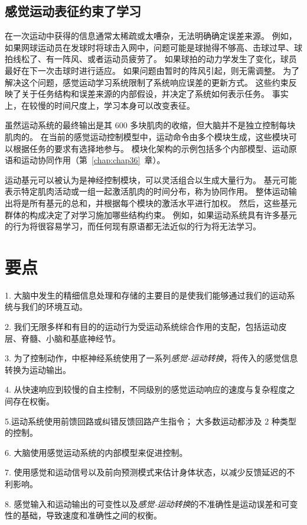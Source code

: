 \subsection{感觉运动表征约束了学习}

在一次运动中获得的信息通常太稀疏或太嘈杂，无法明确确定误差来源。
例如，如果网球运动员在发球时将球击入网中，问题可能是球抛得不够高、击球过早、球拍线松了、有一阵风、或者运动员疲劳了。
如果球拍的动力学发生了变化，球员最好在下一次击球时进行适应。
如果问题由暂时的阵风引起，则无需调整。
为了解决这个问题，感觉运动学习系统限制了系统响应误差的更新方式。
这些约束反映了关于任务结构和误差来源的内部假设，并决定了系统如何表示任务。
事实上，在较慢的时间尺度上，学习本身可以改变表征。


虽然运动系统的最终输出是其 600 多块肌肉的收缩，但大脑并不是独立控制每块肌肉的。
在当前的感觉运动控制模型中，运动命令由多个模块生成，这些模块可以根据任务的要求有选择地参与。
模块化架构的示例包括多个内部模型、运动原语和运动协同作用（第~\ref{chap:chap36}~章）。


运动基元可以被认为是神经控制模块，可以灵活组合以生成大量行为。
基元可能表示特定肌肉活动或一组一起激活肌肉的时间分布，称为协同作用。
整体运动输出将是所有基元的总和，并根据每个模块的激活水平进行加权。
然后，这些基元群体的构成决定了对学习施加哪些结构约束。
例如，如果运动系统具有许多基元的行为将很容易学习，而任何现有原语都无法近似的行为将无法学习。



\section{要点}

1. 大脑中发生的精细信息处理和存储的主要目的是使我们能够通过我们的运动系统与我们的环境互动。


2. 我们无限多样和有目的的运动行为受运动系统综合作用的支配，包括运动皮层、脊髓、小脑和基底神经节。


3. 为了控制动作，中枢神经系统使用了一系列\textit{感觉-运动转换}，将传入的感觉信息转换为运动输出。


4. 从快速响应到较慢的自主控制，不同级别的感觉运动响应的速度与复杂程度之间存在权衡。


5.运动系统使用前馈回路或纠错反馈回路产生指令；
大多数运动都涉及 2 种类型的控制。


6. 大脑使用感觉运动系统的内部模型来促进控制。


7. 使用感觉和运动信号以及前向预测模式来估计身体状态，以减少反馈延迟的不利影响。


8. 感觉输入和运动输出的可变性以及\textit{感觉-运动转换}的不准确性是运动误差和可变性的基础，导致速度和准确性之间的权衡。


